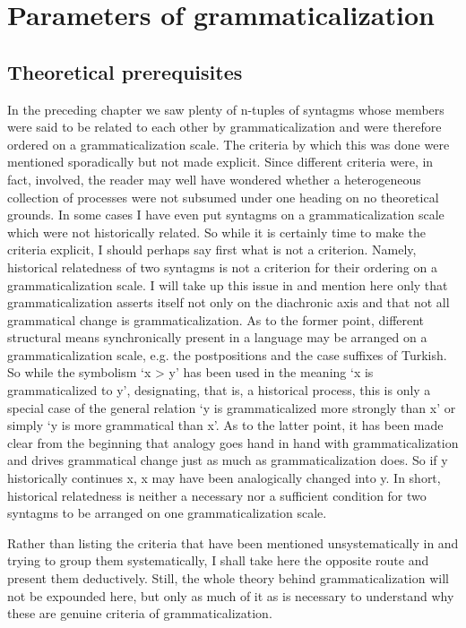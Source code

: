 \chapter{Parameters of grammaticalization}\label{chap:4}
\section{Theoretical prerequisites}

In the preceding chapter we saw plenty of n-tuples of syntagms whose members were said to be related to each other by grammaticalization and were therefore ordered on a grammaticalization scale. The criteria by which this was done were mentioned sporadically but not made explicit. Since different criteria were, in fact, involved, the reader may well have wondered whether a heterogeneous collection of processes were not subsumed under one heading on no theoretical grounds. In some cases I have even put syntagms on a grammaticalization scale which were not historically related. So while it is certainly time to make the criteria explicit, I should perhaps say first what is not a criterion. Namely, historical relatedness of two syntagms is not a criterion for their ordering on a grammaticalization scale. I will take up this issue in  and mention here only that grammaticalization asserts itself not only on the diachronic axis and that not all grammatical change is grammaticalization. As to the former point, different structural means synchronically present in a language may be arranged on a grammaticalization scale, e.g. the postpositions and the case suffixes of Turkish. So while the symbolism ‘x {\textgreater} y’ has been used in the meaning ‘x is grammaticalized to y’, designating, that is, a historical process, this is only a special case of the general relation ‘y is grammaticalized more strongly than x’ or simply ‘y is more grammatical than x’. As to the latter point, it has been made clear from the beginning that analogy goes hand in hand with grammaticalization and drives grammatical change just as much as grammaticalization does. So if y historically continues x, x may have been analogically changed into y. In short, historical relatedness is neither a necessary nor a sufficient condition for two syntagms to be arranged on one grammaticalization scale.

Rather than listing the criteria that have been mentioned unsystematically in  and trying to group them systematically, I shall take here the opposite route and present them deductively. Still, the whole theory behind grammaticalization will not be expounded here, but only as much of it as is necessary to understand why these are genuine criteria of grammaticalization.

